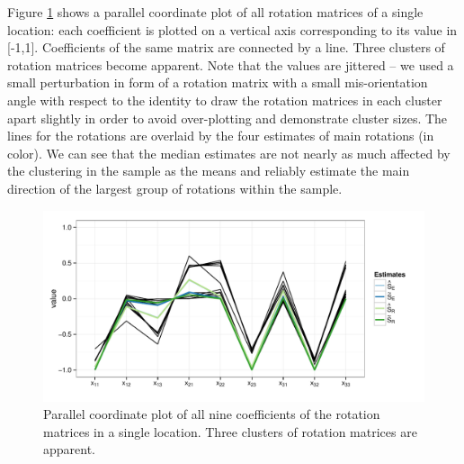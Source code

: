 {Figure \ref{fig:pcp} shows a parallel coordinate plot of  all rotation matrices of a single location: each coefficient is plotted on a vertical axis corresponding to its value in [-1,1]. Coefficients of the same matrix are connected by a line. Three clusters of rotation matrices become apparent. Note that the values are jittered -- we used a small perturbation in form of a rotation matrix with a small mis-orientation angle with respect to the identity to draw the rotation matrices in each cluster apart slightly in order to avoid over-plotting and demonstrate cluster sizes. The lines for the rotations are overlaid by the four estimates of main rotations (in color). We can see that the median estimates are 
not nearly as much affected by the clustering in the sample as the means and reliably estimate the main direction of the largest group of rotations within the sample.
\begin{figure}[htbp] %
   \centering
   \includegraphics[width=.6\textwidth]{images/pcp.pdf} 
   \caption{ \label{fig:pcp}Parallel coordinate plot of all nine coefficients of the rotation matrices in a single location. Three clusters of rotation matrices are apparent.  }
\end{figure}

}

